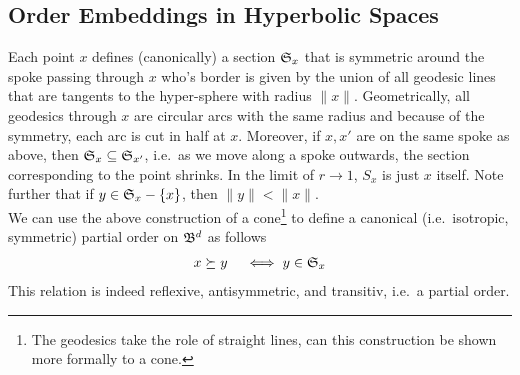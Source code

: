 \documentclass{article}
\begin{document}
\subsection*{Order Embeddings in Hyperbolic Spaces}

Each point $x$ defines (canonically) a section $\frak S_x$ that is symmetric around the spoke passing through $x$ who's  border is given by the union of all geodesic lines that are tangents to the hyper-sphere with radius $\|x\|$.  Geometrically, all geodesics through $x$ are circular arcs with the same radius and because of the symmetry, each arc is cut in half at $x$. Moreover, if $x,x'$ are on the same spoke as above, then $\frak S_x \subseteq \frak S_{x'}$, i.e.~as we move along a spoke outwards, the section corresponding to the point shrinks. In the limit of $r \to 1$, $S_x$ is just $x$ itself. Note further that if $y \in \frak S_x - \{x\}$, then $\|y\|< \|x\|$. \\

We can use the above construction of a cone\footnote{The geodesics take the role of straight lines, can this construction be shown more formally to a cone.} to define a canonical (i.e.~isotropic, symmetric) partial order on $\frak B^d$ as follows
\begin{align}
x \succeq y \quad \iff y \in \frak S_x
\end{align}
This relation is indeed reflexive, antisymmetric, and transitiv, i.e.~a partial order. 






\end{document}
